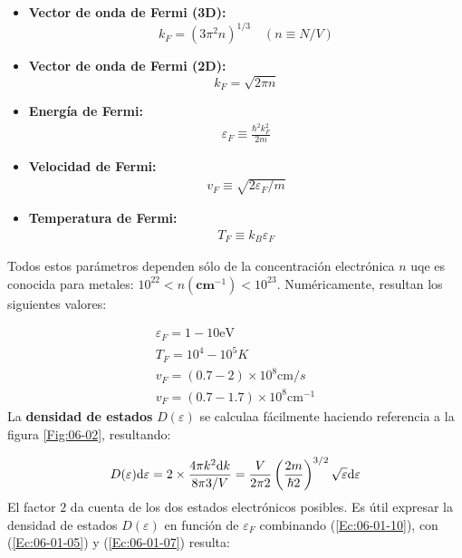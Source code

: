 \begin{itemize}
	\item \textbf{Vector de onda de Fermi (3D):}
	\begin{equation}
		k_F = (3\pi^2 n)^{1/3} \quad (n\equiv N/V) \label{Ec:06-01-05}
	\end{equation}
	\item \textbf{Vector de onda de Fermi (2D):}
	\begin{equation}
		k_F= \sqrt{2\pi n}
	\end{equation}
	\item \textbf{Energía de Fermi:}
	\begin{eqnarray}
		\varepsilon_F \equiv \frac{\hbar^2 k_F^2}{2m} \label{Ec:06-01-07}
	\end{eqnarray}
	\item \textbf{Velocidad de Fermi:}
	\begin{eqnarray}
	v_F \equiv \sqrt{2\varepsilon_F /m} \label{Ec:06-01-08}
	\end{eqnarray}
	\item \textbf{Temperatura de Fermi:}
	\begin{eqnarray}
		T_F \equiv k_B \varepsilon_F 
	\end{eqnarray}
\end{itemize}
Todos estos parámetros dependen sólo de la concentración electrónica $n$ uqe es conocida para metales: $10^{22}<n(\textbf{cm}^{-1})<10^{23}$. Numéricamente, resultan los siguientes valores:

\begin{equation*}
	\begin{array}{c}
	\varepsilon_F = 1-10 \unit{\eV} \\
	T_F = 10^4 - 10^5 \unit{K} \\
	v_F = (0.7-2)\times 10^8 \unit{\cm/s}\\
	v_F = (0.7-1.7)\times 10^8 \unit{\cm^{-1}}
	\end{array}
\end{equation*}
La \textbf{densidad de estados} $D(\varepsilon)$ se calculaa fácilmente haciendo referencia a la figura \ref{Fig:06-02}, resultando:

\begin{equation}
	D(\varepsilon) \mathrm{d} \varepsilon = 2 \times \frac{4\pi k^2 \mathrm{d} k}{8 \pi3 /V} = \frac{V}{2\pi2} \left( \frac{2m}{\hbar2} \right)^{3/2} \sqrt{\varepsilon} \mathrm{d} \varepsilon \label{Ec:06-01-10}
\end{equation}
El factor $2$ da cuenta de los dos estados electrónicos posibles. Es útil expresar la densidad de estados $D(\varepsilon)$ en función de $\varepsilon_F$ combinando (\ref{Ec:06-01-10}), con (\ref{Ec:06-01-05}) y (\ref{Ec:06-01-07}) resulta:

